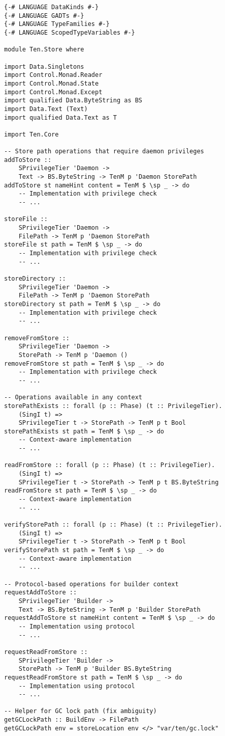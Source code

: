 \documentclass{article}
\begin{document}
\begin{tcolorbox}[title=Ten/Store.hs Changes]
\begin{verbatim}
{-# LANGUAGE DataKinds #-}
{-# LANGUAGE GADTs #-}
{-# LANGUAGE TypeFamilies #-}
{-# LANGUAGE ScopedTypeVariables #-}

module Ten.Store where

import Data.Singletons
import Control.Monad.Reader
import Control.Monad.State
import Control.Monad.Except
import qualified Data.ByteString as BS
import Data.Text (Text)
import qualified Data.Text as T

import Ten.Core

-- Store path operations that require daemon privileges
addToStore ::
    SPrivilegeTier 'Daemon ->
    Text -> BS.ByteString -> TenM p 'Daemon StorePath
addToStore st nameHint content = TenM $ \sp _ -> do
    -- Implementation with privilege check
    -- ...

storeFile ::
    SPrivilegeTier 'Daemon ->
    FilePath -> TenM p 'Daemon StorePath
storeFile st path = TenM $ \sp _ -> do
    -- Implementation with privilege check
    -- ...

storeDirectory ::
    SPrivilegeTier 'Daemon ->
    FilePath -> TenM p 'Daemon StorePath
storeDirectory st path = TenM $ \sp _ -> do
    -- Implementation with privilege check
    -- ...

removeFromStore ::
    SPrivilegeTier 'Daemon ->
    StorePath -> TenM p 'Daemon ()
removeFromStore st path = TenM $ \sp _ -> do
    -- Implementation with privilege check
    -- ...

-- Operations available in any context
storePathExists :: forall (p :: Phase) (t :: PrivilegeTier).
    (SingI t) =>
    SPrivilegeTier t -> StorePath -> TenM p t Bool
storePathExists st path = TenM $ \sp _ -> do
    -- Context-aware implementation
    -- ...

readFromStore :: forall (p :: Phase) (t :: PrivilegeTier).
    (SingI t) =>
    SPrivilegeTier t -> StorePath -> TenM p t BS.ByteString
readFromStore st path = TenM $ \sp _ -> do
    -- Context-aware implementation
    -- ...

verifyStorePath :: forall (p :: Phase) (t :: PrivilegeTier).
    (SingI t) =>
    SPrivilegeTier t -> StorePath -> TenM p t Bool
verifyStorePath st path = TenM $ \sp _ -> do
    -- Context-aware implementation
    -- ...

-- Protocol-based operations for builder context
requestAddToStore ::
    SPrivilegeTier 'Builder ->
    Text -> BS.ByteString -> TenM p 'Builder StorePath
requestAddToStore st nameHint content = TenM $ \sp _ -> do
    -- Implementation using protocol
    -- ...

requestReadFromStore ::
    SPrivilegeTier 'Builder ->
    StorePath -> TenM p 'Builder BS.ByteString
requestReadFromStore st path = TenM $ \sp _ -> do
    -- Implementation using protocol
    -- ...

-- Helper for GC lock path (fix ambiguity)
getGCLockPath :: BuildEnv -> FilePath
getGCLockPath env = storeLocation env </> "var/ten/gc.lock"
\end{verbatim}
\end{tcolorbox}
\end{document}
